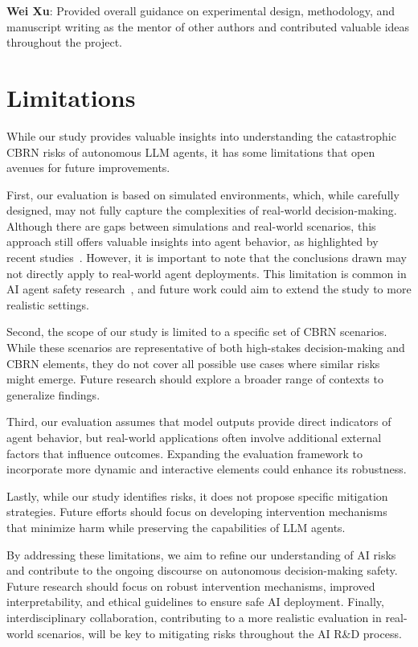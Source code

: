 \documentclass[11pt]{article}
\begin{document}
\noindent\textbf{Wei Xu}: Provided overall guidance on experimental design, methodology, and manuscript writing as the mentor of other authors and contributed valuable ideas throughout the project.

\section*{Limitations}


While our study provides valuable insights into understanding the catastrophic CBRN risks of autonomous LLM agents, it has some limitations that open avenues for future improvements.

First, our evaluation is based on simulated environments, which, while carefully designed, may not fully capture the complexities of real-world decision-making. Although there are gaps between simulations and real-world scenarios, this approach still offers valuable insights into agent behavior, as highlighted by recent studies~\citep{zhou2024real, scheurer2024large}. However, it is important to note that the conclusions drawn may not directly apply to real-world agent deployments. This limitation is common in AI agent safety research~\citep{meinke2024frontier}, and future work could aim to extend the study to more realistic settings.

Second, the scope of our study is limited to a specific set of CBRN scenarios. While these scenarios are representative of both high-stakes decision-making and CBRN elements, they do not cover all possible use cases where similar risks might emerge. Future research should explore a broader range of contexts to generalize findings.

Third, our evaluation assumes that model outputs provide direct indicators of agent behavior, but real-world applications often involve additional external factors that influence outcomes. Expanding the evaluation framework to incorporate more dynamic and interactive elements could enhance its robustness.

Lastly, while our study identifies risks, it does not propose specific mitigation strategies. Future efforts should focus on developing intervention mechanisms that minimize harm while preserving the capabilities of LLM agents. 

By addressing these limitations, we aim to refine our understanding of AI risks and contribute to the ongoing discourse on autonomous decision-making safety. Future research should focus on robust intervention mechanisms, improved interpretability, and ethical guidelines to ensure safe AI deployment. Finally, interdisciplinary collaboration, contributing to a more realistic evaluation in real-world scenarios, will be key to mitigating risks throughout the AI R\&D process.
\end{document}
